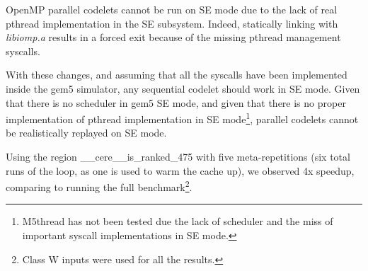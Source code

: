 \documentclass{article}
\begin{document}
\begin{multicols}{2}
OpenMP parallel codelets cannot be run on SE mode due to the lack of real pthread implementation in the SE subsystem. Indeed, statically linking with \textit{libiomp.a} results in a forced exit because of the missing pthread management syscalls.

\medskip
With these changes, and assuming that all the syscalls have been implemented inside the gem5 simulator, any sequential codelet should work in SE mode. Given that there is no scheduler in gem5 SE mode, and given that there is no proper implementation of pthread implementation in SE mode\footnote{M5thread has not been tested due the lack of scheduler and the miss of important syscall implementations in SE mode.}, parallel codelets cannot be realistically replayed on SE mode.


\medskip
Using the region \_\_cere\_\_is\_ranked\_475 with five meta-repetitions (six total runs of the loop, as one is used to warm the cache up), we observed 4x speedup, comparing to running the full benchmark\footnote{Class W inputs were used for all the results.}.

\end{multicols}
\end{document}
